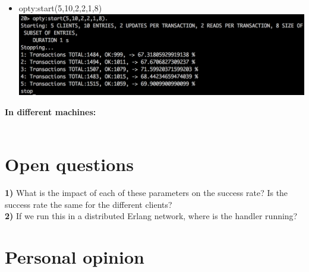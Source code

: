 \documentclass[a4paper, 11pt]{article}
\begin{document}
\begin{itemize}
\item opty:start(5,10,2,2,1,8)\\
\includegraphics[scale=0.5]{images/exp-v-5.png} \\
\end{itemize}

\textbf{In different machines:}\\\\


\section{Open questions}

\textbf{1)} What is the impact of each of these parameters on the success rate? Is the success rate the same for the different clients?\\
\textbf{2)} If we run this in a distributed Erlang network, where is the handler running?\\


\section{Personal opinion}
\end{document}
